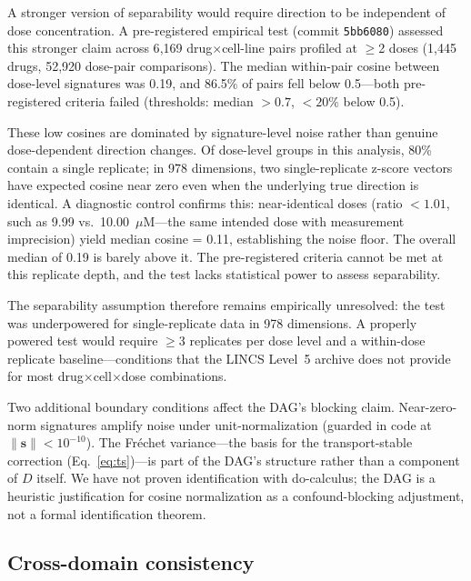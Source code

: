 \documentclass[11pt]{article}
\begin{document}
A stronger version of separability would require direction to be
independent of dose concentration. A pre-registered empirical test
(commit \texttt{5bb6080}) assessed this stronger claim across 6{,}169
drug$\times$cell-line pairs profiled at $\geq$2 doses (1{,}445 drugs,
52{,}920 dose-pair comparisons). The median within-pair cosine between
dose-level signatures was 0.19, and 86.5\% of pairs fell below
0.5---both pre-registered criteria failed (thresholds: median $> 0.7$,
$< 20\%$ below 0.5).

These low cosines are dominated by signature-level noise rather than
genuine dose-dependent direction changes. Of dose-level groups in this
analysis, 80\% contain a single replicate; in 978 dimensions, two
single-replicate z-score vectors have expected cosine near zero even
when the underlying true direction is identical. A diagnostic control
confirms this: near-identical doses (ratio $< 1.01$, such as 9.99 vs.\
10.00~$\mu$M---the same intended dose with measurement imprecision)
yield median cosine = 0.11, establishing the noise floor. The overall
median of 0.19 is barely above it. The pre-registered criteria cannot
be met at this replicate depth, and the test lacks statistical power
to assess separability.

The separability assumption therefore remains empirically unresolved:
the test was underpowered for single-replicate data in 978 dimensions.
A properly powered test would require $\geq$3 replicates per dose
level and a within-dose replicate baseline---conditions that the LINCS
Level~5 archive does not provide for most drug$\times$cell$\times$dose
combinations.

Two additional boundary conditions affect the DAG's blocking claim.
Near-zero-norm signatures amplify noise under unit-normalization
(guarded in code at $\|\mathbf{s}\| < 10^{-10}$). The Fr\'{e}chet
variance---the basis for the transport-stable correction
(Eq.~\ref{eq:ts})---is part of the DAG's structure rather than a
component of $D$ itself. We have not proven identification with
do-calculus; the DAG is a heuristic justification for cosine
normalization as a confound-blocking adjustment, not a formal
identification theorem.

\subsection{Cross-domain consistency}
\end{document}
